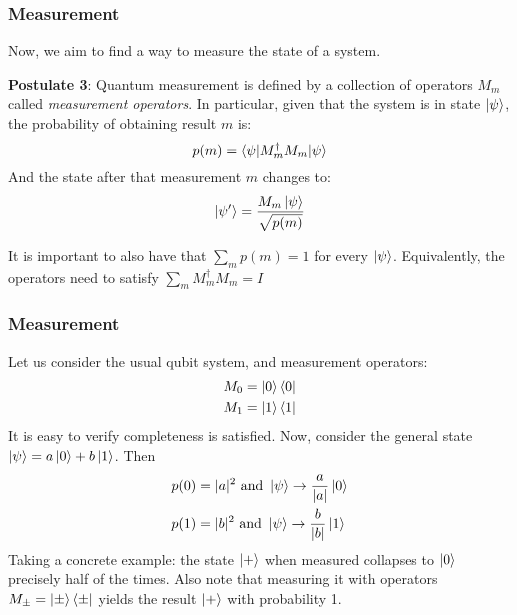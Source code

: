 \documentclass{beamer}
\begin{document}
\begin{frame}
    \frametitle{Measurement}
    Now, we aim to find a way to measure the state of a system.
    \begin{definition}
        \textbf{Postulate 3}: Quantum measurement is defined by a collection of operators
        ${M_m}$ called \textit{measurement operators}. In particular, given that the system is
        in state $\ket{\psi}$, the probability of obtaining result $m$ is:
        \begin{equation}
            p(m) = \braket{\psi|M_m^\dagger M_m|\psi}
        \end{equation}
        And the state after that measurement $m$ changes to:
        \begin{equation}
            \ket{\psi'} = \frac{M_m \ket{\psi}}{\sqrt{p(m)}}
        \end{equation}
    \end{definition}
    It is important to also have that $\sum_m p(m) = 1$ for every $\ket{\psi}$.
    Equivalently, the operators need to satisfy $\sum_m M_m^\dagger M_m = I$
\end{frame}
\begin{frame}
    \frametitle{Measurement}
    \begin{example}
        Let us consider the usual qubit system, and measurement operators:
        \begin{align}
            M_0 & = \ket{0}\bra{0} \\
            M_1 & = \ket{1}\bra{1}
        \end{align}
        It is easy to verify completeness is satisfied. Now, consider the general state
        $\ket{\psi} = a\ket{0} + b\ket{1}$. Then
        \begin{align}
            p(0) & = |a|^2 \text{ and } \ket{\psi} \to \frac{a}{|a|} \ket{0} \\
            p(1) & = |b|^2 \text{ and } \ket{\psi} \to \frac{b}{|b|} \ket{1}
        \end{align}
        Taking a concrete example: the state $\ket{+}$ when measured collapses
        to $\ket{0}$ precisely half of the times.
        Also note that measuring it with operators $M_{\pm} = \ket{\pm}\bra{\pm}$
        yields the result $\ket{+}$ with probability 1.
    \end{example}
\end{frame}
\end{document}

